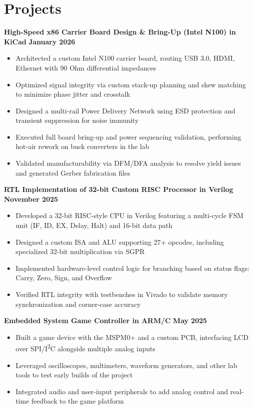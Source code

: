 \documentclass[10pt, letterpaper]{article}
\begin{document}
\section*{Projects}
\noindent\textbf{High-Speed x86 Carrier Board Design \& Bring-Up (Intel N100) in KiCad} \hfill \textbf{January 2026}
\vspace{-1pt}
\begin{itemize}[leftmargin=0.1in, noitemsep, topsep=0pt, itemsep=1pt, parsep=0pt]
    \item Architected a custom Intel N100 carrier board, routing USB 3.0, HDMI, Ethernet with 90 Ohm differential impedances
    \item Optimized signal integrity via custom stack-up planning and skew matching to minimize phase jitter and crosstalk
    \item Designed a multi-rail Power Delivery Network using ESD protection and transient suppression for noise immunity
    \item Executed full board bring-up and power sequencing validation, performing hot-air rework on buck converters in the lab
    \item Validated manufacturability via DFM/DFA analysis to resolve yield issues and generated Gerber fabrication files
\end{itemize}

\vspace{4pt}
\noindent\textbf{RTL Implementation of 32-bit Custom RISC Processor in Verilog} \hfill \textbf{November 2025}
\vspace{-1pt}
\begin{itemize}[leftmargin=0.1in, noitemsep, topsep=0pt, itemsep=1pt, parsep=0pt]
    \item Developed a 32-bit RISC-style CPU in Verilog featuring a multi-cycle FSM unit (IF, ID, EX, Delay, Halt) and 16-bit data path
    \item Designed a custom ISA and ALU supporting 27+ opcodes, including specialized 32-bit multiplication via SGPR
    \item Implemented hardware-level control logic for branching based on status flags: Carry, Zero, Sign, and Overflow
    \item Verified RTL integrity with testbenches in Vivado to validate memory synchronization and corner-case accuracy
\end{itemize}

\vspace{4pt}
\noindent\textbf{Embedded System Game Controller in ARM/C} \hfill \textbf{May 2025}
\vspace{-1pt}
\begin{itemize}[leftmargin=0.1in, noitemsep, topsep=0pt, itemsep=1pt, parsep=0pt]
    \item Built a game device with the MSPM0+ and a custom PCB, interfacing LCD over SPI/I\textsuperscript{2}C alongside multiple analog inputs
    \item Leveraged oscilloscopes, multimeters, waveform generators, and other lab tools to test early builds of the project
    \item Integrated audio and user-input peripherals to add analog control and real-time feedback to the game platform
\end{itemize}
\end{document}

